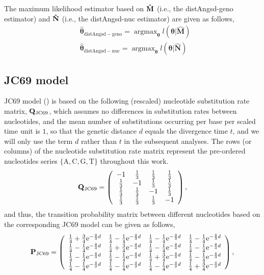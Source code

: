 \documentclass{article}
\DeclareMathOperator*{\argmax}{argmax}
\begin{document}
The maximum likelihood estimator based on ${\bf \hat{M}}$ (i.e., the distAngsd-geno estimator) and ${\bf \hat{N}}$ (i.e., the distAngsd-nuc estimator) are given as follows,
\begin{align*}
&\bm{\hat{\theta}}_{\mathrm{distAngsd-geno}}=\argmax_{\bm{\theta}}l(\bm{\theta}|\mathbf{\hat{M}})\\
&\bm{\hat{\theta}}_{\mathrm{distAngsd-nuc}}=\argmax_{\bm{\theta}}l(\bm{\theta}|\mathbf{\hat{N}})
\end{align*}
\subsection{JC69 model}\label{subsec:MLJC69}
JC69 model (\cite{Jukes_Cantor:1969}) is based on the following (rescaled) nucleotide substitution rate matrix, ${\bf Q}_{\mathrm{JC69}}$, which assumes no differences in substitution rates between nucleotides, and the mean number of substitutions occurring per base per scaled time unit is $1$, so that the genetic distance $d$ equals the divergence time $t$, and we will only use the term $d$ rather than $t$ in the subsequent analyses. The rows (or columns) of the nucleotide substitution rate matrix represent the pre-ordered nucleotides series $\{\mathrm{A,C,G,T}\}$ throughout this work.
\begin{align*}
{\bf Q}_{\mathrm{JC69}}=\left(\begin{array}{cccc}
    -1 & \frac{1}{3} & \frac{1}{3} & \frac{1}{3}\\
     \frac{1}{3} & -1 & \frac{1}{3} & \frac{1}{3} \\
     \frac{1}{3} & \frac{1}{3} & -1 & \frac{1}{3} \\
     \frac{1}{3} & \frac{1}{3} & \frac{1}{3} & -1
\end{array}\right),
\end{align*}
and thus, the transition probability matrix between different nucleotides based on the corresponding JC69 model can be given as follows,
\begin{align*}
{\bf P}_{\mathrm{JC69}}=\left(\begin{array}{cccc}
    \frac{1}{4}+\frac{3}{4}{\rm e}^{-\frac{4}{3}d} & \frac{1}{4}-\frac{1}{4}{\rm e}^{-\frac{4}{3}d} & \frac{1}{4}-\frac{1}{4}{\rm e}^{-\frac{4}{3}d} & \frac{1}{4}-\frac{1}{4}{\rm e}^{-\frac{4}{3}d}\\
     \frac{1}{4}-\frac{1}{4}{\rm e}^{-\frac{4}{3}d} & \frac{1}{4}+\frac{3}{4}{\rm e}^{-\frac{4}{3}d} & \frac{1}{4}-\frac{1}{4}{\rm e}^{-\frac{4}{3}d} & \frac{1}{4}-\frac{1}{4}{\rm e}^{-\frac{4}{3}d} \\
     \frac{1}{4}-\frac{1}{4}{\rm e}^{-\frac{4}{3}d} & \frac{1}{4}-\frac{1}{4}{\rm e}^{-\frac{4}{3}d} & \frac{1}{4}+\frac{3}{4}{\rm e}^{-\frac{4}{3}d} & \frac{1}{4}-\frac{1}{4}{\rm e}^{-\frac{4}{3}d} \\
     \frac{1}{4}-\frac{1}{4}{\rm e}^{-\frac{4}{3}d} & \frac{1}{4}-\frac{1}{4}{\rm e}^{-\frac{4}{3}d} & \frac{1}{4}-\frac{1}{4}{\rm e}^{-\frac{4}{3}d} & \frac{1}{4}+\frac{3}{4}{\rm e}^{-\frac{4}{3}d}
\end{array}\right),
\end{align*}
\end{document}
